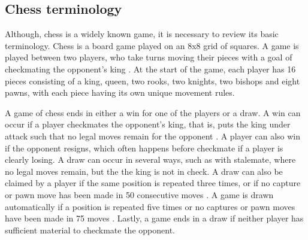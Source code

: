 




\subsection{Chess terminology}
\label{sec:chess terminology}

Although, chess is a widely known game, it is necessary to review its basic terminology. Chess is a board game played on an 8x8 grid of squares. A game is played between two players, who take turns moving their pieces with a goal of checkmating the opponent's king \cite{fidechessrules}. At the start of the game, each player has 16 pieces consisting of a king, queen, two rooks, two knights, two bishops and eight pawns, with each piece having its own unique movement rules.

A game of chess ends in either a win for one of the players or a draw. A win can occur if a player checkmates the opponent's king, that is, puts the king under attack such that no legal moves remain for the opponent \cite{fidechessrules}. A player can also win if the opponent resigns, which often happens before checkmate if a player is clearly losing. A draw can occur in several ways, such as with stalemate, where no legal moves remain, but the the king is not in check. A draw can also be claimed by a player if the same position is repeated three times, or if no capture or pawn move has been made in 50 consecutive moves \cite{fidechessrules}. A game is drawn automatically if a position is repeated five times or no captures or pawn moves have been made in 75 moves \cite{fidechessrules}. Lastly, a game ends in a draw if neither player has sufficient material to checkmate the opponent.

